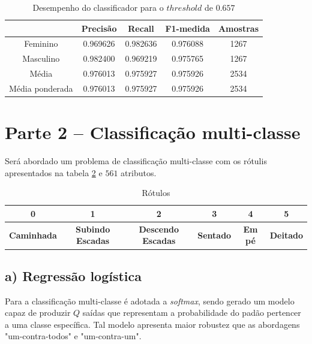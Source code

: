 \documentclass{article}
\begin{document}
    \begin{table}[]
        \begin{tabular}{ccccc}
        \hline
        \textbf{} & \textbf{Precisão} & \textbf{Recall} & \textbf{F1-medida} & \textbf{Amostras} \\ \hline
        \multicolumn{1}{c|}{Feminino} & \multicolumn{1}{c|}{0.969626} & \multicolumn{1}{c|}{0.982636} & \multicolumn{1}{c|}{0.976088} & \multicolumn{1}{c|}{1267} \\ \cline{2-5} 
        \multicolumn{1}{c|}{Masculino} & \multicolumn{1}{c|}{0.982400} & \multicolumn{1}{c|}{0.969219} & \multicolumn{1}{c|}{0.975765} & \multicolumn{1}{c|}{1267} \\ \cline{2-5} 
        \multicolumn{1}{c|}{Média} & \multicolumn{1}{c|}{0.976013} & \multicolumn{1}{c|}{0.975927} & \multicolumn{1}{c|}{0.975926} & \multicolumn{1}{c|}{2534} \\ \cline{2-5} 
        \multicolumn{1}{c|}{Média ponderada} & \multicolumn{1}{c|}{0.976013} & \multicolumn{1}{c|}{0.975927} & \multicolumn{1}{c|}{0.975926} & \multicolumn{1}{c|}{2534} \\ \hline
        \end{tabular}
        \caption{Desempenho do classificador para o $threshold$ de $0.657$}
        \label{table:ex1_desempenho}
    \end{table}
    
    \section[]{Parte 2 – Classificação multi-classe}
    Será abordado um problema de classificação multi-classe com os rótulis apresentados na tabela \ref{table:ex2_rotulos} e $561$ atributos.
    \begin{table}[]
        \begin{tabular}{|c|c|c|c|c|c|}
        \hline
        0 & 1 & 2 & 3 & 4 & \textbf{5} \\ \hline
        \textbf{Caminhada} & \textbf{Subindo Escadas} & \textbf{Descendo Escadas} & \textbf{Sentado} & \textbf{Em pé} & \textbf{Deitado} \\ \hline
        \end{tabular}
        \caption{Rótulos}
        \label{table:ex2_rotulos}
    \end{table}
    \subsection[]{a) Regressão logística}
    Para a classificação multi-classe é adotada a \textit{softmax}, sendo gerado um modelo capaz de produzir $Q$
    saídas que representam a probabilidade do padão pertencer a uma classe específica. Tal modelo apresenta
    maior robustez que as abordagens "um-contra-todos" e "um-contra-um".
\end{document}
